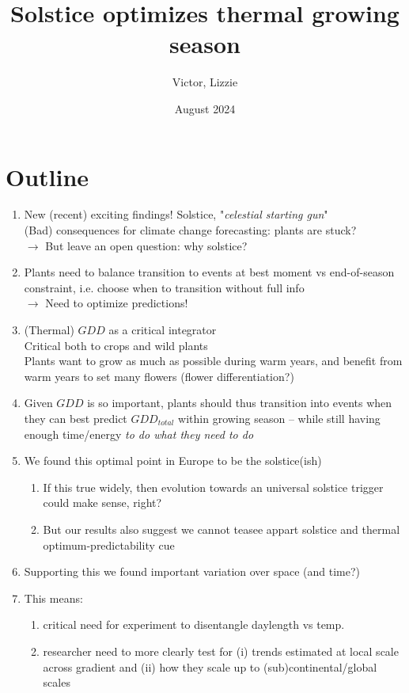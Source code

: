 \documentclass[11pt,letter]{article}
\title{Solstice optimizes thermal growing season}
\author{Victor, Lizzie}
\date{August 2024}
\begin{document}
\maketitle

\section*{Outline}

\begin{enumerate}

\item New (recent) exciting findings! Solstice, "\emph{celestial starting gun}"\\
(Bad) consequences for climate change forecasting: plants are stuck? \\
$\rightarrow$ But leave an open question: why solstice?

\item Plants need to balance transition to events at best moment vs end-of-season constraint, i.e. choose when to transition without full info\\
$\rightarrow$ Need to optimize predictions!

\item (Thermal) $GDD$ as a critical integrator\\
Critical both to crops and wild plants\\
Plants want to grow as much as possible during warm years, and benefit from warm years to set many flowers (flower differentiation?)

\item Given $GDD$ is so important, plants should thus transition into events when they can best predict $GDD_{total}$ within growing season -- while still having enough time/energy \emph{to do what they need to do}

\item We found this optimal point in Europe to be the solstice(ish)\\
\begin{enumerate}
    \item If this true widely, then evolution towards an universal solstice trigger could make sense, right? 
    \item But our results also suggest we cannot teasee appart solstice and thermal optimum-predictability cue
\end{enumerate}

\item Supporting this we found important variation over space (and time?)

\item This means:
\begin{enumerate}
    \item critical need for experiment to disentangle daylength vs temp.
    \item researcher need to more clearly test for (i) trends estimated at local scale across gradient and (ii) how they scale up to (sub)continental/global scales
\end{enumerate}

\end{enumerate}
\end{document}
